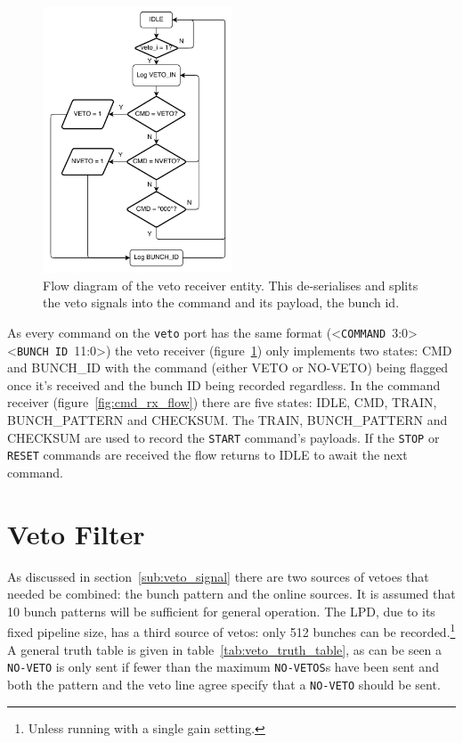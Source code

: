 \begin{figure}[htbp]
  \centering
  \includegraphics[width=0.5\textwidth]{images/pdfs/veto_rx_flow.pdf}
  \caption{Flow diagram of the veto receiver entity. This de-serialises and splits the veto signals into the command and its payload, the bunch id.}
  \label{fig:veto_rx_flow}
\end{figure}

As every command on the \texttt{veto} port has the same format (<\texttt{COMMAND}~3:0><\texttt{BUNCH~ID}~11:0>) the veto receiver (figure~\ref{fig:veto_rx_flow}) only implements two states: CMD and BUNCH\_ID with the command (either VETO or NO-VETO) being flagged once it's received and the bunch ID being recorded regardless. In the command receiver (figure~\ref{fig:cmd_rx_flow}) there are five states: IDLE, CMD, TRAIN, BUNCH\_PATTERN and CHECKSUM. The TRAIN, BUNCH\_PATTERN and CHECKSUM are used to record the \texttt{START} command's payloads. If the \texttt{STOP} or \texttt{RESET} commands are received the flow returns to IDLE to await the next command. 
\section{Veto Filter} %
\label{sec:veto_filter}
As discussed in section~\ref{sub:veto_signal} there are two sources of vetoes that needed be combined: the bunch pattern and the online sources. It is assumed that 10 bunch patterns will be sufficient for general operation. The LPD, due to its fixed pipeline size, has a third source of vetos: only 512 bunches can be recorded.\footnote{Unless running with a single gain setting.} A general truth table is given in table~\ref{tab:veto_truth_table}, as can be seen a \texttt{NO-VETO} is only sent if fewer than the maximum \texttt{NO-VETOS}s have been sent and both the pattern and the veto line agree specify that a \texttt{NO-VETO} should be sent.
    
